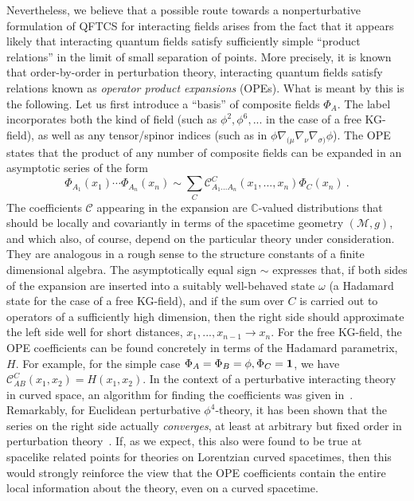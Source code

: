 \documentclass[12pt]{article}
\newcommand{\cC}{\mathcal{C}}
\newcommand{\CC}{\mathbb{C}}
\newcommand{\M}{\mathscr{M}}
\newcommand{\myid}{{\bf 1}}
\renewcommand{\O}{\Phi}
\theoremstyle{plain}
\theoremstyle{definition}
\def\ben{\begin{equation}}
\def\een{\end{equation}}
\begin{document}
Nevertheless, we believe that a possible route towards a nonperturbative formulation of QFTCS for interacting fields
arises from the fact that it appears likely that interacting quantum fields satisfy sufficiently simple ``product relations'' in the limit of small separation of points. More precisely, it is known that order-by-order in perturbation theory, interacting
quantum fields satisfy relations known as {\it operator product expansions} (OPEs).
What is meant by this is the following. Let us first introduce a ``basis'' of composite fields $\O_A$. The label incorporates both the kind of field
(such as $\phi^2, \phi^6, ...$ in the case of a free KG-field), as well as any tensor/spinor indices (such as in $\phi \nabla_{(\mu} \nabla_\nu \nabla_{\sigma)} \phi$). The OPE
states that the product of any number of composite fields can be expanded in an asymptotic series of the form
\ben
\O_{A_1}(x_1) \cdots \O_{A_n}(x_n) \sim \sum_{C} \mathcal{C}_{A_1 ... A_n}^C(x_1, ..., x_n) \O_C(x_n) \ .
\een
The coefficients $\cC$ appearing in the expansion are $\CC$-valued distributions that should be locally and covariantly in terms of the spacetime
geometry $(\M,g)$, and which also, of course, depend on the particular theory under consideration. They are analogous in a rough sense to the structure constants of
a finite dimensional algebra. The asymptotically equal sign $\sim$ expresses that, if both sides of the expansion are inserted into a suitably well-behaved state
$\omega$ (a Hadamard state for the case of a free KG-field), and if the sum over $C$ is carried out to operators of a sufficiently high dimension, then the
right side should approximate the left side well for short distances, $x_1, ..., x_{n-1} \to x_n$. For the free KG-field, the OPE coefficients can be found concretely
in terms of the Hadamard parametrix, $H$. For example, for the simple case $\O_A=\O_B=\phi, \O_C=\myid$, we have $\cC_{AB}^C(x_1,x_2) = H(x_1,x_2)$.
In the context of a perturbative interacting theory in curved space, an algorithm for finding the coefficients was given in~\cite{h4}. Remarkably, for Euclidean perturbative $\phi^4$-theory,
it has been shown that the series on the right side actually {\em converges}, at least at arbitrary but fixed order in perturbation theory~\cite{hoko,koke}. If, as we expect, this also
were found to be true at spacelike related points for theories on Lorentzian curved spacetimes, then this would
strongly reinforce the view that the OPE coefficients contain the entire local information about the theory, even on a curved spacetime.
\end{document}
